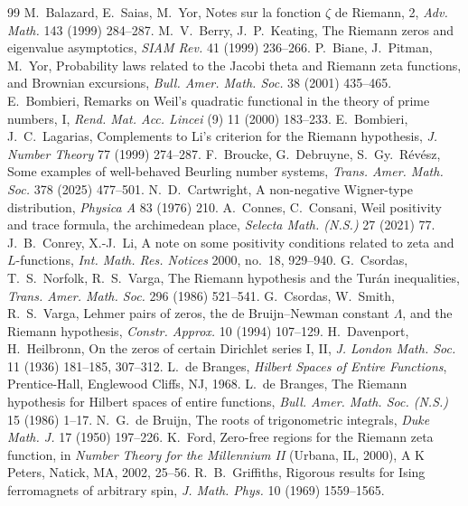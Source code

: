 \documentclass[11pt]{article}
\theoremstyle{definition}\newtheorem{definition}[theorem]{Definition}
\theoremstyle{remark}\newtheorem{remark}[theorem]{Remark}
\begin{document}
\begin{thebibliography}{99}\small
{} M.~Balazard, E.~Saias, M.~Yor, Notes sur la fonction $\zeta$ de Riemann, 2, \emph{Adv. Math.} 143 (1999) 284--287.
 M.~V.~Berry, J.~P.~Keating, The Riemann zeros and eigenvalue asymptotics, \emph{SIAM Rev.} 41 (1999) 236--266.
 P.~Biane, J.~Pitman, M.~Yor, Probability laws related to the Jacobi theta and Riemann zeta functions, and Brownian excursions, \emph{Bull. Amer. Math. Soc.} 38 (2001) 435--465.
 E.~Bombieri, Remarks on Weil's quadratic functional in the theory of prime numbers, I, \emph{Rend. Mat. Acc. Lincei} (9) 11 (2000) 183--233.
 E.~Bombieri, J.~C.~Lagarias, Complements to Li's criterion for the Riemann hypothesis, \emph{J. Number Theory} 77 (1999) 274--287.
 F.~Broucke, G.~Debruyne, S.~Gy.~R\'ev\'esz, Some examples of well-behaved Beurling number systems, \emph{Trans. Amer. Math. Soc.} 378 (2025) 477--501.
 N.~D.~Cartwright, A non-negative Wigner-type distribution, \emph{Physica A} 83 (1976) 210.
 A.~Connes, C.~Consani, Weil positivity and trace formula, the archimedean place, \emph{Selecta Math. (N.S.)} 27 (2021) 77.
 J.~B.~Conrey, X.-J.~Li, A note on some positivity conditions related to zeta and $L$-functions, \emph{Int. Math. Res. Notices} 2000, no.~18, 929--940.
 G.~Csordas, T.~S.~Norfolk, R.~S.~Varga, The Riemann hypothesis and the Tur\'an inequalities, \emph{Trans. Amer. Math. Soc.} 296 (1986) 521--541.
 G.~Csordas, W.~Smith, R.~S.~Varga, Lehmer pairs of zeros, the de Bruijn--Newman constant $\Lambda$, and the Riemann hypothesis, \emph{Constr. Approx.} 10 (1994) 107--129.
 H.~Davenport, H.~Heilbronn, On the zeros of certain Dirichlet series I, II, \emph{J. London Math. Soc.} 11 (1936) 181--185, 307--312.
 L.~de Branges, \emph{Hilbert Spaces of Entire Functions}, Prentice-Hall, Englewood Cliffs, NJ, 1968.
 L.~de Branges, The Riemann hypothesis for Hilbert spaces of entire functions, \emph{Bull. Amer. Math. Soc. (N.S.)} 15 (1986) 1--17.
 N.~G.~de Bruijn, The roots of trigonometric integrals, \emph{Duke Math. J.} 17 (1950) 197--226.
 K.~Ford, Zero-free regions for the Riemann zeta function, in \emph{Number Theory for the Millennium II} (Urbana, IL, 2000), A K Peters, Natick, MA, 2002, 25--56.
 R.~B.~Griffiths, Rigorous results for Ising ferromagnets of arbitrary spin, \emph{J. Math. Phys.} 10 (1969) 1559--1565.

\end{thebibliography}
\end{document}
